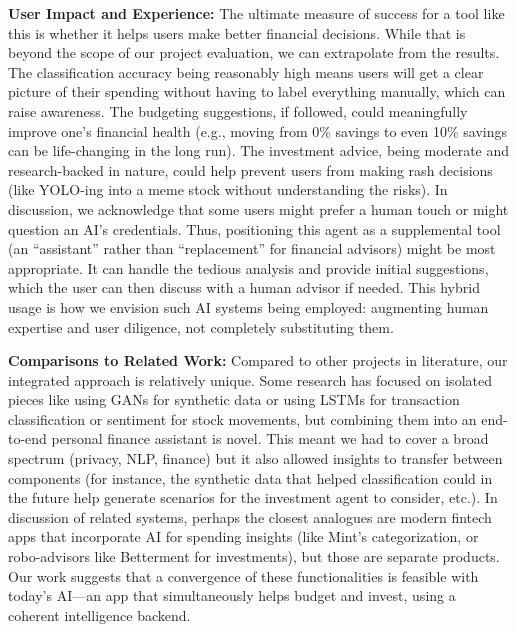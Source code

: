 \documentclass{scrartcl}
\begin{document}
\textbf{User Impact and Experience:} The ultimate measure of success for a tool like this is whether it helps users make better financial decisions. While that is beyond the scope of our project evaluation, we can extrapolate from the results. The classification accuracy being reasonably high means users will get a clear picture of their spending without having to label everything manually, which can raise awareness. The budgeting suggestions, if followed, could meaningfully improve one’s financial health (e.g., moving from 0\% savings to even 10\% savings can be life-changing in the long run). The investment advice, being moderate and research-backed in nature, could help prevent users from making rash decisions (like YOLO-ing into a meme stock without understanding the risks). In discussion, we acknowledge that some users might prefer a human touch or might question an AI’s credentials. Thus, positioning this agent as a supplemental tool (an “assistant” rather than “replacement” for financial advisors) might be most appropriate. It can handle the tedious analysis and provide initial suggestions, which the user can then discuss with a human advisor if needed. This hybrid usage is how we envision such AI systems being employed: augmenting human expertise and user diligence, not completely substituting them.

\textbf{Comparisons to Related Work:} Compared to other projects in literature, our integrated approach is relatively unique. Some research has focused on isolated pieces like using GANs for synthetic data or using LSTMs for transaction classification or sentiment for stock movements, but combining them into an end-to-end personal finance assistant is novel. This meant we had to cover a broad spectrum (privacy, NLP, finance) but it also allowed insights to transfer between components (for instance, the synthetic data that helped classification could in the future help generate scenarios for the investment agent to consider, etc.). In discussion of related systems, perhaps the closest analogues are modern fintech apps that incorporate AI for spending insights (like Mint’s categorization, or robo-advisors like Betterment for investments), but those are separate products. Our work suggests that a convergence of these functionalities is feasible with today’s AI—an app that simultaneously helps budget and invest, using a coherent intelligence backend.
\end{document}
